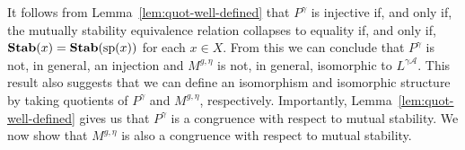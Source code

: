 \documentclass[../main/thesis.tex]{subfiles}
\begin{document}
It follows from Lemma~\ref{lem:quot-well-defined} that $P^{\gamma}$ is injective
if, and only if, the mutually stability equivalence relation collapses to
equality if, and only if, $\text{\textbf{Stab}}(x) = \text{\textbf{Stab}} (\text{sp} (x))$ for each $x \in X$. From this
we can conclude that $P^{\gamma}$ is not, in general, an injection and $M^{g,
  \eta}$ is not, in general, isomorphic to $L^{\gamma \mathcal{A}}$. This result
also suggests that we can define an isomorphism and isomorphic structure by
taking quotients of $P^{\gamma}$ and $M^{g, \eta}$, respectively. Importantly,
Lemma~\ref{lem:quot-well-defined} gives us that $P^{\gamma}$ is a congruence
with respect to mutual stability. We now show that $M^{g, \eta}$ is also a
congruence with respect to mutual stability.
\end{document}
